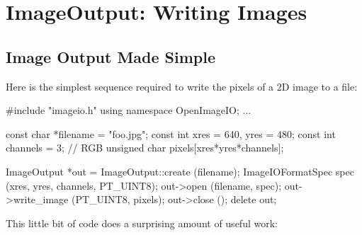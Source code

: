 \chapter{ImageOutput: Writing Images}
\label{chap:imageoutput}


\section{Image Output Made Simple}
\label{sec:imageoutput:simple}

Here is the simplest sequence required to write the pixels of a 2D image
to a file:

\begin{code}
        #include "imageio.h"
        using namespace OpenImageIO;
        ...

        const char *filename = "foo.jpg";
        const int xres = 640, yres = 480;
        const int channels = 3;  // RGB
        unsigned char pixels[xres*yres*channels];

        ImageOutput *out = ImageOutput::create (filename);
        ImageIOFormatSpec spec (xres, yres, channels, PT_UINT8);
        out->open (filename, spec);
        out->write_image (PT_UINT8, pixels);
        out->close ();
        delete out;
\end{code}

\noindent This little bit of code does a surprising amount of useful work:  

